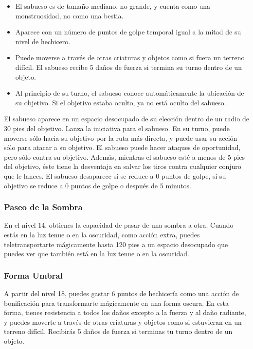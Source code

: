 \documentclass[a4paper,twocolumn,openany,10pt]{dndbook}
\begin{document}
\begin{itemize}
	\item El sabueso es de tamaño mediano, no grande, y cuenta como una monstruosidad, no como una bestia.
	\item Aparece con un número de puntos de golpe temporal igual a la mitad de su nivel de hechicero.
	\item Puede moverse a través de otras criaturas y objetos como si fuera un terreno difícil. El sabueso recibe 5 daños de fuerza
		si termina su turno dentro de un objeto.
	\item Al principio de su turno, el sabueso conoce automáticamente la ubicación de su objetivo. Si el objetivo estaba oculto, ya
		no está oculto del sabueso.
\end{itemize}

El sabueso aparece en un espacio desocupado de su elección dentro de un radio de 30 pies del objetivo. Lanza la iniciativa para
el sabueso. En su turno, puede moverse sólo hacia su objetivo por la ruta más directa, y puede usar su acción sólo para atacar a
su objetivo. El sabueso puede hacer ataques de oportunidad, pero sólo contra su objetivo. Además, mientras el sabueso esté a
menos de 5 pies del objetivo, éste tiene la desventaja en salvar los tiros contra cualquier conjuro que le lances. El sabueso
desaparece si se reduce a 0 puntos de golpe, si su objetivo se reduce a 0 puntos de golpe o después de 5 minutos. 

\subsubsection{Paseo de la Sombra}
En el nivel 14, obtienes la capacidad de pasar de una sombra a otra. Cuando estás en la luz tenue o en la oscuridad, como acción
extra, puedes teletransportarte mágicamente hasta 120 pies a un espacio desocupado que puedes ver que también está en la luz
tenue o en la oscuridad. 

\subsubsection{Forma Umbral}
A partir del nivel 18, puedes gastar 6 puntos de hechicería como una acción de bonificación para transformarte mágicamente en
una forma oscura. En esta forma, tienes resistencia a todos los daños excepto a la fuerza y al daño radiante, y puedes moverte
a través de otras criaturas y objetos como si estuvieran en un terreno difícil. Recibirás 5 daños de fuerza si terminas tu turno
dentro de un objeto.
\end{document}
